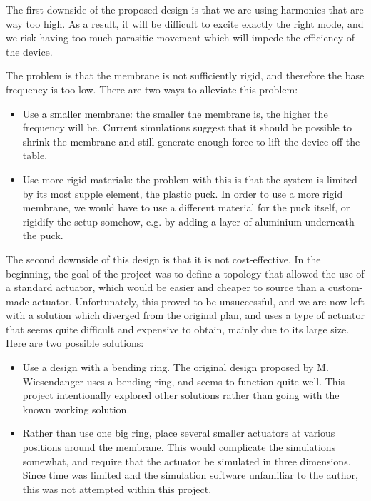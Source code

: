 
The first downside of the proposed design is that we are using harmonics that
are way too high. As a result, it will be difficult to excite exactly the right
mode, and we risk having too much parasitic movement which will impede the
efficiency of the device.

The problem is that the membrane is not sufficiently rigid, and therefore the
base frequency is too low. There are two ways to alleviate this problem:

\begin{itemize}
  \item Use a smaller membrane: the smaller the membrane is, the higher the
    frequency will be. Current simulations suggest that it should be possible to
    shrink the membrane and still generate enough force to lift the device off
    the table.
  \item Use more rigid materials: the problem with this is that the system is
    limited by its most supple element, the plastic puck. In order to use a more
    rigid membrane, we would have to use a different material for the puck
    itself, or rigidify the setup somehow, e.g. by adding a layer of aluminium
    underneath the puck.
\end{itemize}

The second downside of this design is that it is not cost-effective. In the
beginning, the goal of the project was to define a topology that allowed the use
of a standard actuator, which would be easier and cheaper to source than a
custom-made actuator. Unfortunately, this proved to be unsuccessful, and we are
now left with a solution which diverged from the original plan, and uses a type
of actuator that seems quite difficult and expensive to obtain, mainly due to
its large size. Here are two possible solutions:

\begin{itemize}
  \item Use a design with a bending ring. The original design proposed by M.
    Wiesendanger uses a bending ring, and seems to function quite well. This
    project intentionally explored other solutions rather than going with the
    known working solution. 
  \item Rather than use one big ring, place several smaller actuators at various
    positions around the membrane. This would complicate the simulations
    somewhat, and require that the actuator be simulated in three dimensions.
    Since time was limited and the simulation software unfamiliar to the author,
    this was not attempted within this project.
\end{itemize}


